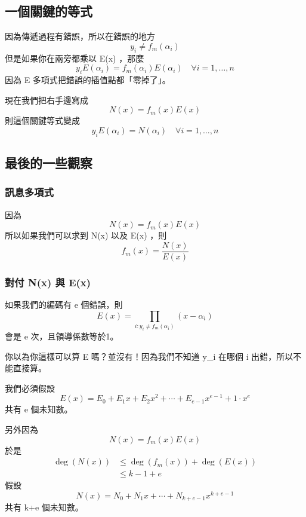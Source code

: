 \documentclass[
]{article}
\begin{document}
\hypertarget{ux4e00ux500bux95dcux9375ux7684ux7b49ux5f0f}{%
\subsection{一個關鍵的等式}\label{ux4e00ux500bux95dcux9375ux7684ux7b49ux5f0f}}

因為傳遞過程有錯誤，所以在錯誤的地方 \[
y_{i} \neq f_{m}(\alpha_{i})
\] 但是如果你在兩旁都乘以 E(x) ，那麼 \[
y_{i}E(\alpha_{i}) = f_{m}(\alpha_{i})E(\alpha_{i})\quad \forall i=1,\dots,n
\] 因為 E 多項式把錯誤的插值點都「零掉了」。

現在我們把右手邊寫成 \[
N(x) = f_{m}(x) E(x)
\] 則這個關鍵等式變成 \[
y_{i}E(\alpha_{i}) = N(\alpha_{i})
\quad \forall i=1,\dots,n
\]

\hypertarget{ux6700ux5f8cux7684ux4e00ux4e9bux89c0ux5bdf}{%
\subsection{最後的一些觀察}\label{ux6700ux5f8cux7684ux4e00ux4e9bux89c0ux5bdf}}

\hypertarget{ux8a0aux606fux591aux9805ux5f0f}{%
\subsubsection{訊息多項式}\label{ux8a0aux606fux591aux9805ux5f0f}}

因為 \[
N(x) = f_{m}(x) E(x)
\] 所以如果我們可以求到 N(x) 以及 E(x) ，則 \[
f_{m}(x) = \frac{N(x)}{E(x)}
\]

\hypertarget{ux5c0dux4ed8-nx-ux8207-ex}{%
\subsubsection{對付 N(x) 與 E(x)}\label{ux5c0dux4ed8-nx-ux8207-ex}}

如果我們的編碼有 e 個錯誤，則 \[
E(x) = \prod_{i: y_{i}\neq f_{m}(\alpha_{i})} (x-\alpha_{i})
\] 會是 e 次，且領導係數等於1。

你以為你這樣可以算 E 嗎？並沒有！因為我們不知道 y\_i 在哪個 i
出錯，所以不能直接算。

我們必須假設 \[
E(x) = E_{0} +E_{1}x+E_{2}x^{2} +\cdots + E_{e-1}x^{e-1}+1\cdot x^e
\] 共有 e 個未知數。

另外因為 \[
N(x) = f_{m}(x)E(x)
\] 於是 \[
\begin{aligned}
\deg(N(x)) &\le \deg(f_{m}(x)) + \deg(E(x)) \\
&\le k-1 + e
\end{aligned}
\] 假設 \[
N(x) = N_0+N_{1}x+\cdots+N_{k+e-1}x^{k+e-1}
\] 共有 k+e 個未知數。
\end{document}
